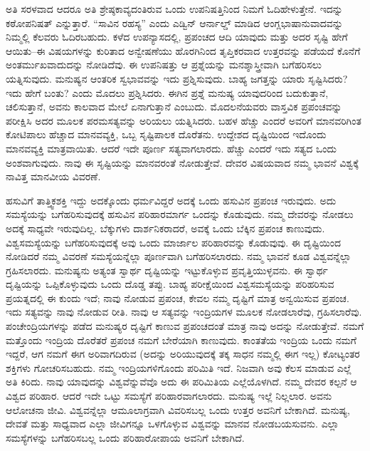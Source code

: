 ಅತಿ ಸರಳವಾದ ಆದರೂ ಅತಿ ಶ್ರೇಷ್ಠಕಾವ್ಯದಂತಿರುವ ಒಂದು ಉಪನಿಷತ್ತಿನಿಂದ ನಿಮಗೆ ಓದಿಹೇಳುತ್ತೇನೆ. ಇದನ್ನು ಕಠೋಪನಿಷತ್​ ಎನ್ನುತ್ತಾರೆ. “ಸಾವಿನ ರಹಸ್ಯ” ಎಂದು ಎಡ್ವಿನ್​ ಆರ್ನಾಲ್ಡ್​ ಮಾಡಿದ ಆಂಗ್ಲಭಾಷಾನುವಾದವನ್ನು ನಿಮ್ಮಲ್ಲಿ ಕೆಲವರು ಓದಿರಬಹುದು. ಕಳೆದ ಉಪನ್ಯಾಸದಲ್ಲಿ, ಪ್ರಪಂಚದ ಆದಿ ಯಾವುದು ಮತ್ತು ಅದರ ಸೃಷ್ಟಿ ಹೇಗೆ ಆಯಿತು–ಈ ವಿಷಯಗಳನ್ನು ಕುರಿತಾದ ಅನ್ವೇಷಣೆಯು ಹೊರಗಿನಿಂದ ತೃಪ್ತಿಕರವಾದ ಉತ್ತರವನ್ನು ಪಡೆಯದೆ ಕೊನೆಗೆ ಅಂತರ್ಮುಖವಾದುದನ್ನು ನೋಡಿದೆವು. ಈ ಉಪನಿಷತ್ತು ಆ ಪ್ರಶ್ನೆಯನ್ನು ಮನಶ್ಶಾಸ್ತ್ರೀವಾಗಿ ಬಗೆಹರಿಸಲು ಯತ್ನಿಸುವುದು. ಮನುಷ್ಯನ ಆಂತರಿಕ ಸ್ವಭಾವವನ್ನು ಇದು ಪ್ರಶ್ನಿಸುವುದು. ಬಾಹ್ಯ ಜಗತ್ತನ್ನು ಯಾರು ಸೃಷ್ಟಿಸಿದರು? ಇದು ಹೇಗೆ ಬಂತು? ಎಂದು ಮೊದಲು ಪ್ರಶ್ನಿಸಿದರು. ಈಗಿನ ಪ್ರಶ್ನೆ ಮನುಷ್ಯ ಯಾವುದರಿಂದ ಬದುಕುತ್ತಾನೆ, ಚಲಿಸುತ್ತಾನೆ, ಅವನು ಕಾಲವಾದ ಮೇಲೆ ಏನಾಗುತ್ತಾನೆ ಎಂಬುದು. ಮೊದಲನೆಯವರು ವಾಸ್ತವಿಕ ಪ್ರಪಂಚವನ್ನು ಪರೀಕ್ಷಿಸಿ ಅದರ ಮೂಲಕ ಪರಮಸತ್ಯವನ್ನು ಅರಿಯಲು ಯತ್ನಿಸಿದರು. ಬಹಳ ಹೆಚ್ಚು ಎಂದರೆ ಅವರಿಗೆ ಮಾನವರಿಗಿಂತ ಕೋಟಿಪಾಲು ಹೆಚ್ಚಾದ ಮಾನವವ್ಯಕ್ತಿ, ಒಬ್ಬ ಸೃಷ್ಟಿಪಾಲಕ ದೊರೆತನು. ಉದ್ದೇಶದ ದೃಷ್ಟಿಯಿಂದ ಇದೊಂದು ಮಾನವವ್ಯಕ್ತಿ ಮಾತ್ರವಾಯಿತು. ಆದರೆ ಇದೇ ಪೂರ್ಣ ಸತ್ಯವಾಗಲಾರದು. ಹೆಚ್ಚು ಎಂದರೆ ಇದು ಸತ್ಯದ ಒಂದು ಅಂಶವಾಗುವುದು. ನಾವು ಈ ಸೃಷ್ಟಿಯನ್ನು ಮಾನವರಂತೆ ನೋಡುತ್ತೇವೆ. ದೇವರ ವಿಷಯವಾದ ನಮ್ಮ ಭಾವನೆ ವಿಶ್ವಕ್ಕೆ ನಾವಿತ್ತ ಮಾನವೀಯ ವಿವರಣೆ.

\vskip 0.2cm 

ಹಸುವಿಗೆ ತಾತ್ತ್ವಿಕಶಕ್ತಿ ಇದ್ದು ಅದಕ್ಕೊಂದು ಧರ್ಮವಿದ್ದರೆ ಅದಕ್ಕೆ ಒಂದು ಹಸುವಿನ ಪ್ರಪಂಚ ಇರುವುದು. ಅದು ಸಮಸ್ಯೆಯನ್ನು ಬಗೆಹರಿಸುವುದಕ್ಕೆ ಹಸುವಿನ ಪರಿಹಾರಮಾರ್ಗ ಒಂದನ್ನು ಕೊಡುವುದು. ನಮ್ಮ ದೇವರನ್ನು ನೋಡಲು ಅದಕ್ಕೆ ಸಾಧ್ಯವೇ ಇರುವುದಿಲ್ಲ. ಬೆಕ್ಕುಗಳು ದಾರ್ಶನಿಕರಾದರೆ, ಅವಕ್ಕೆ ಒಂದು ಬೆಕ್ಕಿನ ಪ್ರಪಂಚ ಕಾಣುವುದು. ವಿಶ್ವಸಮಸ್ಯೆಯನ್ನು ಬಗೆಹರಿಸುವುದಕ್ಕೆ ಅವು ಒಂದು ಮಾರ್ಜಾಲ ಪರಿಹಾರವನ್ನು ಕೊಡುವುವು. ಈ ದೃಷ್ಟಿಯಿಂದ ನೋಡಿದರೆ ನಮ್ಮ ವಿವರಣೆ ಸಮಸ್ಯೆಯನ್ನೆಲ್ಲಾ ಪೂರ್ಣವಾಗಿ ಬಗೆಹರಿಸಲಾರದು. ನಮ್ಮ ಭಾವನೆ ಕೂಡ ವಿಶ್ವವನ್ನೆಲ್ಲಾ ಗ್ರಹಿಸಲಾರದು. ಮನುಷ್ಯನು ಅತ್ಯಂತ ಸ್ವಾರ್ಥ ದೃಷ್ಟಿಯನ್ನು ಇಟ್ಟುಕೊಳ್ಳುವ ಪ್ರವೃತ್ತಿಯುಳ್ಳವನು. ಈ ಸ್ವಾರ್ಥ ದೃಷ್ಟಿಯನ್ನು ಒಪ್ಪಿಕೊಳ್ಳುವುದು ಒಂದು ದೊಡ್ಡ ತಪ್ಪು. ಬಾಹ್ಯ ಪರೀಕ್ಷೆಯಿಂದ ವಿಶ್ವಸಮಸ್ಯೆಯನ್ನು ಪರಿಹರಿಸುವ ಪ್ರಯತ್ನದಲ್ಲಿ ಈ ಕುಂದು ಇದೆ; ನಾವು ನೋಡುವ ಪ್ರಪಂಚ, ಕೇವಲ ನಮ್ಮ ದೃಷ್ಟಿಗೆ ಮಾತ್ರ ಅನ್ವಯಿಸುವ ಪ್ರಪಂಚ. ಇದು ಸತ್ಯವನ್ನು ನಾವು ನೋಡುವ ರೀತಿ. ನಾವು ಆ ಸತ್ಯವನ್ನು ಇಂದ್ರಿಯಗಳ ಮೂಲಕ ನೋಡಲಾರೆವು, ಗ್ರಹಿಸಲಾರೆವು. ಪಂಚೇಂದ್ರಿಯಗಳನ್ನು ಪಡೆದ ಮನುಷ್ಯರ ದೃಷ್ಟಿಗೆ ಕಾಣುವ ಪ್ರಪಂಚದಂತೆ ಮಾತ್ರ ನಾವು ಅದನ್ನು ನೋಡುತ್ತೇವೆ. ನಮಗೆ ಮತ್ತೊಂದು ಇಂದ್ರಿಯ ದೊರೆತರೆ ಪ್ರಪಂಚ ನಮಗೆ ಬೇರೆಯಾಗಿ ಕಾಣುವುದು. ಕಾಂತತೆಯ ಇಂದ್ರಿಯ ಒಂದು ನಮಗೆ ಇದ್ದರೆ, ಆಗ ನಮಗೆ ಈಗ ಅರಿವಾಗದಿರುವ (ಅದನ್ನು ಅರಿಯುವುದಕ್ಕೆ ತಕ್ಕ ಸಾಧನ ನಮ್ಮಲ್ಲಿ ಈಗ ಇಲ್ಲ) ಕೋಟ್ಯಂತರ ಶಕ್ತಿಗಳು ಗೋಚರಿಸಬಹುದು. ನಮ್ಮ ಇಂದ್ರಿಯಗಳಿಗೊಂದು ಪರಿಮಿತಿ ಇದೆ. ನಿಜವಾಗಿ ಅವು ಕೆಲಸ ಮಾಡುವ ಎಲ್ಲೆ ಅತಿ ಕಿರಿದು. ನಾವು ಯಾವುದನ್ನು ವಿಶ್ವವೆನ್ನುವೆವೊ ಅದು ಈ ಪರಿಮಿತಿಯ ಎಲ್ಲೆಯೊಳಗಿದೆ. ನಮ್ಮ ದೇವರ ಕಲ್ಪನೆ ಆ ವಿಶ್ವದ ಪರಿಹಾರ. ಆದರೆ ಇದೇ ಒಟ್ಟು ಸಮಸ್ಯೆಗೆ ಪರಿಹಾರವಾಗಲಾರದು. ಮನುಷ್ಯ ಇಲ್ಲೆ ನಿಲ್ಲಲಾರ. ಅವನು ಆಲೋಚನಾ ಜೀವಿ. ವಿಶ್ವವನ್ನೆಲ್ಲಾ ಆಮೂಲಾಗ್ರವಾಗಿ ವಿವರಿಸಬಲ್ಲ ಒಂದು ಉತ್ತರ ಅವನಿಗೆ ಬೇಕಾಗಿದೆ. ಮನುಷ್ಯ, ದೇವತೆ ಮತ್ತು ಸಾಧ್ಯವಾದ ಎಲ್ಲಾ ಜೀವಿಗನ್ನೂ ಒಳಗೊಳ್ಳುವ ವಿಶ್ವವನ್ನು ಮಾನವ ನೋಡಬಯಸುವನು. ಎಲ್ಲಾ ಸಮಸ್ಯೆಗಳನ್ನು ಬಗೆಹರಿಸಬಲ್ಲ ಒಂದು ಪರಿಹಾರೋಪಾಯ ಅವನಿಗೆ ಬೇಕಾಗಿದೆ.


